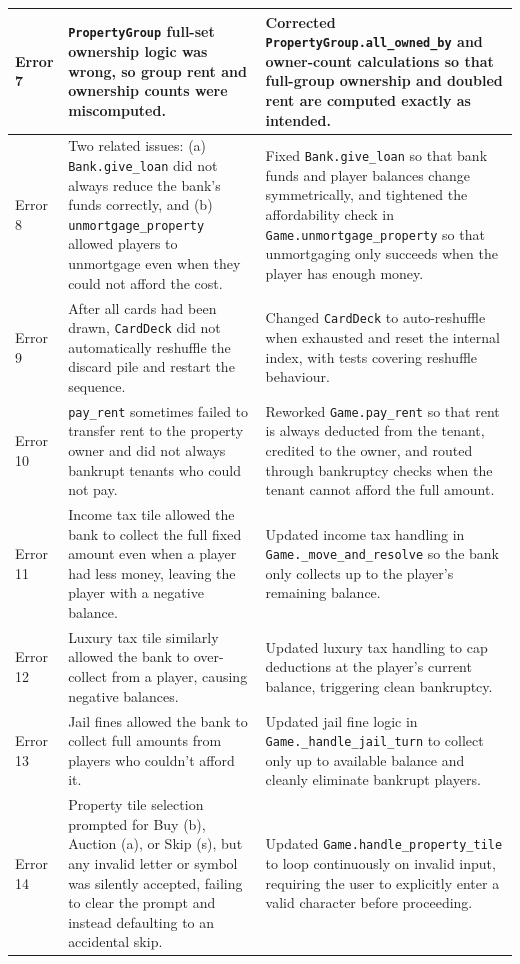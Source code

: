 \documentclass[11pt]{article}
\begin{document}
\begin{longtable}{>{\raggedright\arraybackslash}p{} >{\raggedright\arraybackslash}p{} >{\raggedright\arraybackslash}p{}}
Error 7 & \texttt{PropertyGroup} full-set ownership logic was wrong, so group rent and ownership counts were miscomputed. & Corrected \texttt{PropertyGroup.all\_owned\_by} and owner-count calculations so that full-group ownership and doubled rent are computed exactly as intended. \\ \hline
Error 8 & Two related issues: (a) \texttt{Bank.give\_loan} did not always reduce the bank's funds correctly, and (b) \texttt{unmortgage\_property} allowed players to unmortgage even when they could not afford the cost. & Fixed \texttt{Bank.give\_loan} so that bank funds and player balances change symmetrically, and tightened the affordability check in \texttt{Game.unmortgage\_property} so that unmortgaging only succeeds when the player has enough money. \\ \hline
Error 9 & After all cards had been drawn, \texttt{CardDeck} did not automatically reshuffle the discard pile and restart the sequence. & Changed \texttt{CardDeck} to auto-reshuffle when exhausted and reset the internal index, with tests covering reshuffle behaviour. \\ \hline
Error 10 & \texttt{pay\_rent} sometimes failed to transfer rent to the property owner and did not always bankrupt tenants who could not pay. & Reworked \texttt{Game.pay\_rent} so that rent is always deducted from the tenant, credited to the owner, and routed through bankruptcy checks when the tenant cannot afford the full amount. \\ \hline
Error 11 & Income tax tile allowed the bank to collect the full fixed amount even when a player had less money, leaving the player with a negative balance. & Updated income tax handling in \texttt{Game.\_move\_and\_resolve} so the bank only collects up to the player's remaining balance. \\ \hline
Error 12 & Luxury tax tile similarly allowed the bank to over-collect from a player, causing negative balances. & Updated luxury tax handling to cap deductions at the player's current balance, triggering clean bankruptcy. \\ \hline
Error 13 & Jail fines allowed the bank to collect full amounts from players who couldn't afford it. & Updated jail fine logic in \texttt{Game.\_handle\_jail\_turn} to collect only up to available balance and cleanly eliminate bankrupt players. \\ \hline
Error 14 & Property tile selection prompted for Buy (b), Auction (a), or Skip (s), but any invalid letter or symbol was silently accepted, failing to clear the prompt and instead defaulting to an accidental skip. & Updated \texttt{Game.handle\_property\_tile} to loop continuously on invalid input, requiring the user to explicitly enter a valid character before proceeding. \\ \hline
\end{longtable}
\end{document}

